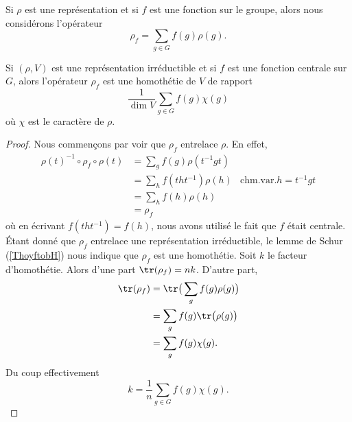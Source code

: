 Si \( \rho\) est une représentation et si \( f\) est une fonction sur le groupe, alors nous considérons l'opérateur
\begin{equation}
	\rho_f=\sum_{g\in G}f(g)\rho(g).
\end{equation}

\begin{proposition}  \label{PropEAXkAY}
	Si \( (\rho,V)\) est une représentation irréductible et si \( f\) est une fonction centrale sur \( G\), alors l'opérateur \( \rho_f\) est une homothétie de \( V\) de rapport
	\begin{equation}
		\frac{1}{ \dim V }\sum_{g\in G}f(g)\chi(g)
	\end{equation}
	où \( \chi\) est le caractère de \( \rho\).
\end{proposition}

\begin{proof}
	Nous commençons par voir que \( \rho_f\) entrelace \( \rho\). En effet,
	\begin{subequations}
		\begin{align}
			\rho(t)^{-1}\circ\rho_f\circ\rho(t) & =\sum_gf(g)\rho(t^{-1}gt)                              \\
			                                    & =\sum_hf(tht^{-1})\rho(h) & \text{chm.var.} h=t^{-1}gt \\
			                                    & =\sum_hf(h)\rho(h)                                     \\
			                                    & =\rho_f
		\end{align}
	\end{subequations}
	où en écrivant \( f(tht^{-1})=f(h)\), nous avons utilisé le fait que \( f\) était centrale. Étant donné que \( \rho_f\) entrelace une représentation irréductible, le lemme de Schur (\ref{ThoyftobH}) nous indique que \( \rho_f\) est une homothétie. Soit \( k\) le facteur d'homothétie. Alors d'une part \( \tr(\rho_f)=nk\). D'autre part,
	\begin{subequations}
		\begin{align}
			\tr(\rho_f) & =\tr\big( \sum_gf(g)\rho(g) \big) \\
			            & =\sum_gf(g)\tr\big( \rho(g) \big) \\
			            & =\sum_gf(g)\chi(g).
		\end{align}
	\end{subequations}
	Du coup effectivement
	\begin{equation}
		k=\frac{1}{ n }\sum_{g\in G}f(g)\chi(g).
	\end{equation}
\end{proof}

